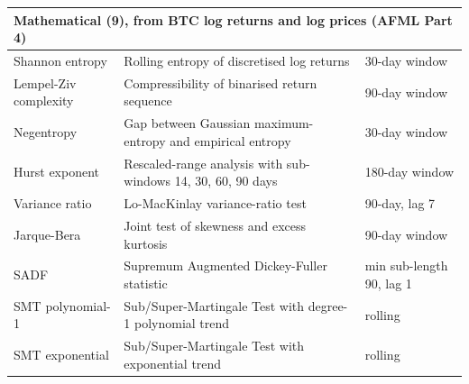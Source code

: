 \documentclass[12pt,a4paper,oneside]{article}
\begin{document}
\begin{longtable}{p{3.5cm}p{7cm}p{2.5cm}}
\midrule
\multicolumn{3}{l}{\textbf{Mathematical (9), from BTC log returns and log prices (AFML Part 4)}} \\
\midrule
Shannon entropy & Rolling entropy of discretised log returns & 30-day window \\
Lempel-Ziv complexity & Compressibility of binarised return sequence & 90-day window \\
Negentropy & Gap between Gaussian maximum-entropy and empirical entropy & 30-day window \\
Hurst exponent & Rescaled-range analysis with sub-windows 14, 30, 60, 90 days & 180-day window \\
Variance ratio & Lo-MacKinlay variance-ratio test \citep{lo_mackinlay_1988} & 90-day, lag 7 \\
Jarque-Bera & Joint test of skewness and excess kurtosis & 90-day window \\
SADF & Supremum Augmented Dickey-Fuller statistic & min sub-length 90, lag 1 \\
SMT polynomial-1 & Sub/Super-Martingale Test with degree-1 polynomial trend & rolling \\
SMT exponential & Sub/Super-Martingale Test with exponential trend & rolling \\


\end{longtable}
\end{document}
